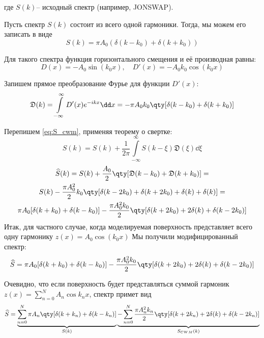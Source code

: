\documentclass[a4paper,14pt]{extarticle}
\begin{document}
 где $S(k)$-- исходный спектр (например, JONSWAP).

 Пусть спектр $S(k)$ состоит из всего одной гармоники. Тогда, мы можем его
 записать в виде
 \begin{equation}
     \label{eq:}
     S(k) = \pi A_{0}( \delta(k-k_{0}) + \delta(k+k_{0}))
 \end{equation}

 Для такого спектра функция горизонтального смещения и её производная равны:
 \begin{equation}
     \label{eq:}
     D(x) = -A_{0} \sin(k_{0} x), \quad
     D'(x) = -A_{0} k_{0} \cos(k_{0} x)
 \end{equation}

 Запишем прямое преобразование Фурье для функции $D'(x)$:
 \newcommand{\D}{\mathfrak{D}}
  \begin{equation}
     \label{eq:}
     \D(k) = \int\limits_{-\infty}^{\infty} D'(x) e^{-ikx} \dd x =
     - \pi A_{0}k_{0}\qty[\delta(k-k_{0})+\delta(k+k_{0})]
 \end{equation}

 Перепишем \eqref{eq:S_cwm}, применяя теорему о свертке:
\begin{equation}
    \label{eq:}
    \widehat S(k) = S(k) +
    \frac{1}{2\pi} \int\limits_{-\infty}^{\infty} S(k-\xi) \D(\xi) \dd \xi 
\end{equation}
\begin{gather}
    \label{eq:}
    \widehat S(k) = S(k) + \frac{A_{0}}{2} \qty[\D(k-k_{0}) + \D(k+k_{0})] = \\
    S(k) - \frac{\pi A_{0}^2}{2} k_{0} \qty[
    \delta(k-2k_{0}) +
    \delta(k+2k_{0}) +
    \delta(k) +
    \delta(k) 
    ] = \\
    \pi A_{0}[\delta(k+k_{0})+ \delta(k-k_{0})] -
    \frac{\pi A_{0}^2k_{0}}{2}\qty[ \delta(k+2k_{0}) + 2\delta(k) +
    \delta(k-2k_{0})]
\end{gather}
Итак, для частного случае, когда моделируемая поверхность представляет всего
одну гармонику $z(x) = A_{0}\cos(k_{0}x)$
Мы получили модифицированный спектр:
\begin{equation}
    \label{eq:}
    \widehat S = 
    \pi A_{0}[\delta(k+k_{0})+ \delta(k-k_{0})] -
    \frac{\pi A_{0}^2k_{0}}{2}\qty[ \delta(k+2k_{0}) + 2\delta(k) +
    \delta(k-2k_{0})]
\end{equation}

Очевидно, что если поверхность будет представляться суммой гармоник
$z(x) = \sum\limits_{n=0}^{N} A_n \cos{k_n x}$,
спектр примет вид
\begin{equation}
    \label{eq:}
    \widehat S = 
    \underbrace{
    \sum\limits_{n=0}^{N} \pi A_n \qty[\delta(k+k_n) + \delta(k-k_n) ]
}_{S(k)}
\underbrace{
- \sum\limits_{n=0}^{N} \frac{\pi A_{n}^2 k_n}{2}
\qty[ \delta(k+2k_{n}) 
    + 2\delta(k) 
+ \delta(k-2k_{n})]
}_{S_{CWM}(k)}
\end{equation}
\end{document}
